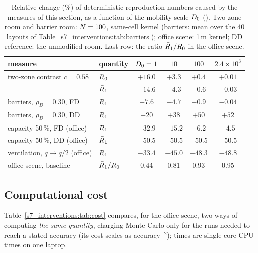 \begin{table}[tbp]
  \centering\footnotesize\setlength{\tabcolsep}{5pt}
  \caption{Relative change (\%) of deterministic reproduction numbers caused by the measures of this section,
  as a function of the mobility scale $D_0$ (\cdunit). Two-zone room and barrier room: $N=100$,
  same-cell kernel (barriers: mean over the 40 layouts of Table~\ref{s7_interventions:tab:barriers}); office
  scene: 1\,m kernel; DD reference: the unmodified room. Last row: the ratio $\bar{R}_1/R_0$ in the office scene.}
  \label{s7_interventions:tab:regime}
  \begin{tabular}{@{}llcccc@{}}
    \toprule
    measure & quantity & $D_0=1$ & $10$ & $100$ & $2.4\times10^{3}$ \\
    \midrule
    two-zone contrast $c=0.58$ & $R_0$ & $+16.0$ & $+3.3$ & $+0.4$ & $+0.01$ \\
     & $\bar{R}_1$ & $-14.6$ & $-4.3$ & $-0.6$ & $-0.03$ \\
    barriers, $\rho_B=0.30$, FD & $\bar{R}_1$ & $-7.6$ & $-4.7$ & $-0.9$ & $-0.04$ \\
    barriers, $\rho_B=0.30$, DD & $\bar{R}_1$ & $+20$ & $+38$ & $+50$ & $+52$ \\
    capacity 50\,\%, FD (office) & $\bar{R}_1$ & $-32.9$ & $-15.2$ & $-6.2$ & $-4.5$ \\
    capacity 50\,\%, DD (office) & $\bar{R}_1$ & $-50.5$ & $-50.5$ & $-50.5$ & $-50.5$ \\
    ventilation, $q\to q/2$ (office) & $\bar{R}_1$ & $-33.4$ & $-45.0$ & $-48.3$ & $-48.8$ \\
    \midrule
    office scene, baseline & $\bar{R}_1/R_0$ & 0.44 & 0.81 & 0.93 & 0.95 \\
    \bottomrule
  \end{tabular}
\end{table}

\subsection{Computational cost}\label{appD_tables:sec:cost}\label{s7_interventions:sec:cost}

Table~\ref{s7_interventions:tab:cost} compares, for the
office scene, two ways of computing \emph{the same quantity}, charging Monte Carlo only for the runs needed to
reach a stated accuracy (its cost scales as accuracy$^{-2}$); times are single-core CPU times on one laptop.

